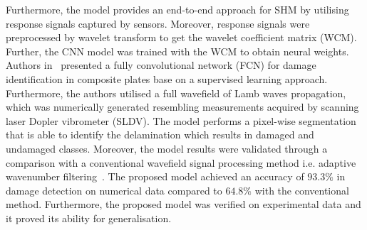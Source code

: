 Furthermore, the model provides an end-to-end approach for SHM by utilising response signals captured by sensors.
Moreover, response signals were preprocessed by wavelet transform to get the wavelet coefficient matrix (WCM).
Further, the CNN model was trained with the WCM to obtain neural weights.
Authors in~\cite{Ijjeh2021} presented a fully convolutional network (FCN)  for damage identification in composite plates base on a supervised learning approach.
Furthermore, the authors utilised a full wavefield of Lamb waves propagation, which was numerically generated resembling measurements acquired by scanning laser Dopler vibrometer (SLDV).
The model performs a pixel-wise segmentation that is able to identify the delamination which results in damaged and undamaged classes.
Moreover, the model results were validated through a comparison with a conventional wavefield signal processing method i.e. adaptive wavenumber filtering~\cite{Radzienski2019,Kudela2018}.
The proposed model achieved an accuracy of \(93.3\%\) in damage detection on numerical data compared to  \(64.8\%\) with the conventional method.
Furthermore, the proposed model was verified on experimental data and it proved its ability for generalisation.

